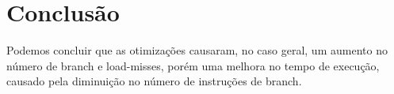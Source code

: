 \section{Conclusão}
Podemos concluir que as otimizações causaram, no caso geral, um aumento no número de branch e load-misses, porém uma melhora no tempo de execução, causado pela diminuição no número de instruções de branch.